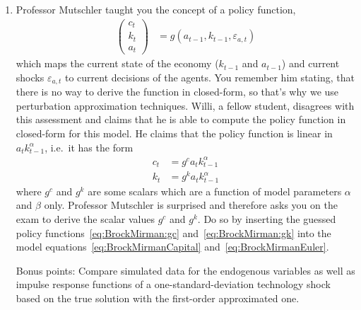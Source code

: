 \documentclass{article}
\begin{document}
\begin{enumerate}
\begin{enumerate}
\end{enumerate}

\newpage

\item
Professor Mutschler taught you the concept of a policy function,
\begin{align*}
\begin{pmatrix} c_{t}\\k_{t}\\a_{t} \end{pmatrix}
&= g(a_{t-1},k_{t-1},\varepsilon_{a,t})
\end{align*}
  which maps the current state of the economy (\(k_{t-1}\) and \(a_{t-1}\))
  and current shocks \(\varepsilon_{a,t}\) to current decisions of the agents.
You remember him stating, that there is no way to derive the function in closed-form,
  so that's why we use perturbation approximation techniques.
Willi, a fellow student, disagrees with this assessment
  and claims that he is able to compute the policy function in closed-form for this model.
He claims that the policy function is linear in \(a_t k_{t-1}^\alpha \),
  i.e.\ it has the form
\begin{align}
c_{t} &= g^c a_t k_{t-1}^\alpha \label{eq:BrockMirman:gc}
\\
k_{t} & = g^k a_t k_{t-1}^\alpha \label{eq:BrockMirman:gk}
\end{align}
  where \(g^c\) and \(g^k\) are some scalars which are a function of model parameters \(\alpha \) and \(\beta \) only.
Professor Mutschler is surprised and therefore asks you on the exam to derive the scalar values \(g^c\) and \(g^k\).
Do so by inserting the guessed policy functions~\eqref{eq:BrockMirman:gc} and~\eqref{eq:BrockMirman:gk}
  into the model equations~\eqref{eq:BrockMirmanCapital} and~\eqref{eq:BrockMirmanEuler}.

\item
[Bonus points:] Compare simulated data for the endogenous variables
  as well as impulse response functions of a one-standard-deviation technology shock
  based on the true solution with the first-order approximated one.

\end{enumerate} 
\end{document}
